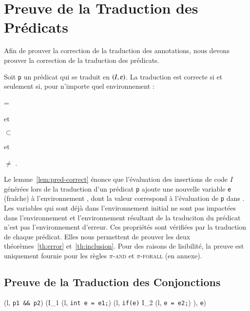 \section{Preuve de la Traduction des Prédicats}
\label{sec:predicate-translation}


Afin de prouver la correction de la traduction des annotations,
nous devons prouver la correction de la traduction des prédicats.

\begin{lemma}
  \label{lem:pred-correct}
  Soit \lstinline'p' un prédicat qui se traduit en $(I, \mbox{\lstinline'e'})$.
  La traduction est correcte si et seulement si, pour n'importe quel
  environnement \env :
  
   = 
  
  et
  
  \env $\subset$ 

  et

   $\neq$ \errorenv.
\end{lemma}

Le lemme~\ref{lem:pred-correct} énonce que l'évaluation des insertions de code
$I$ générées lors de la traduction d'un prédicat \lstinline'p' ajoute une
nouvelle variable \lstinline'e' (fraîche) à l'environnement \env, dont la valeur
correspond à l'évaluation de \lstinline'p' dans \env.
Les variables qui sont déjà dans l'environnement initial \env ne sont pas
impactées dans l'environnement  et l'environnement résultant de
la traduciton du prédicat n'est pas l'environnement d'erreur.
Ces propriétés sont vérifiées par la traduction de chaque prédicat.
Elles nous permettent de prouver les deux théorèmes~\ref{th:error}
et~\ref{th:inclusion}.
Pour des raisons de lisibilité, la preuve est uniquement fournie pour les règles
\textsc{$\pi$-and} et \textsc{$\pi$-forall} (en annexe).


\subsection{Preuve de la Traduction des Conjonctions}

{
  { (l, \mbox{\lstinline'p1 && p2'}) 
    (I_1 \cdot (l, \mbox{\lstinline'int e = e1;'}) \cdot
    (l, \mbox{\lstinline'if(e)'} \bopen I_2 \cdot
    (l, \mbox{\lstinline'e = e2;'}) \bclose ),
    \mbox{\lstinline'e'})
  }
}~\\


